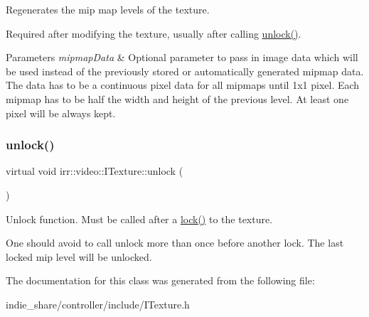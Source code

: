 Regenerates the mip map levels of the texture. 

Required after modifying the texture, usually after calling \hyperlink{classirr_1_1video_1_1ITexture_a15b9a25aa18528ade37a492bd7b20a10}{unlock()}. 
\begin{DoxyParams}{Parameters}
{\em mipmap\+Data} & Optional parameter to pass in image data which will be used instead of the previously stored or automatically generated mipmap data. The data has to be a continuous pixel data for all mipmaps until 1x1 pixel. Each mipmap has to be half the width and height of the previous level. At least one pixel will be always kept. \\
\hline
\end{DoxyParams}
\mbox{\label{classirr_1_1video_1_1ITexture_a15b9a25aa18528ade37a492bd7b20a10}} 
\subsubsection{\texorpdfstring{unlock()}{unlock()}}
{\footnotesize\ttfamily virtual void irr\+::video\+::\+I\+Texture\+::unlock (\begin{DoxyParamCaption}{ }\end{DoxyParamCaption})\hspace{0.3cm}{\ttfamily [pure virtual]}}



Unlock function. Must be called after a \hyperlink{classirr_1_1video_1_1ITexture_aa09ee89973a645ebdd2bd61ed859df38}{lock()} to the texture. 

One should avoid to call unlock more than once before another lock. The last locked mip level will be unlocked. 

The documentation for this class was generated from the following file\+:\begin{DoxyCompactItemize}
\item 
indie\+\_\+share/controller/include/I\+Texture.\+h\end{DoxyCompactItemize}
